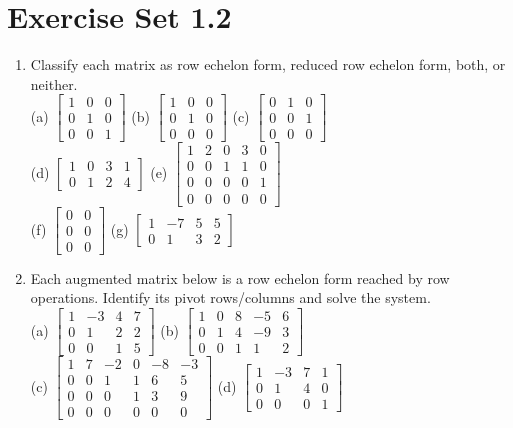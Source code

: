 \documentclass{article}
\theoremstyle{mystyle}
\begin{document}
\section*{Exercise Set 1.2}
\begin{enumerate}
    \item[1.] Classify each matrix as row echelon form, reduced row echelon form, both, or neither.\\
    (a) $\begin{bmatrix}1&0&0\\0&1&0\\0&0&1\end{bmatrix}$
    (b) $\begin{bmatrix}1&0&0\\0&1&0\\0&0&0\end{bmatrix}$
    (c) $\begin{bmatrix}0&1&0\\0&0&1\\0&0&0\end{bmatrix}$\\[2mm]
    (d) $\begin{bmatrix}1&0&3&1\\0&1&2&4\end{bmatrix}$
    (e) $\begin{bmatrix}1&2&0&3&0\\0&0&1&1&0\\0&0&0&0&1\\0&0&0&0&0\end{bmatrix}$\\[2mm]
    (f) $\begin{bmatrix}0&0\\0&0\\0&0\end{bmatrix}$
    (g) $\begin{bmatrix}1&-7&5&5\\0&1&3&2\end{bmatrix}$

    \item[3.] Each augmented matrix below is a row echelon form reached by row operations. Identify its pivot rows/columns and solve the system.\\
    (a) $\begin{bmatrix}1&-3&4&7\\0&1&2&2\\0&0&1&5\end{bmatrix}$
    (b) $\begin{bmatrix}1&0&8&-5&6\\0&1&4&-9&3\\0&0&1&1&2\end{bmatrix}$\\[2mm]
    (c) $\begin{bmatrix}1&7&-2&0&-8&-3\\0&0&1&1&6&5\\0&0&0&1&3&9\\0&0&0&0&0&0\end{bmatrix}$
    (d) $\begin{bmatrix}1&-3&7&1\\0&1&4&0\\0&0&0&1\end{bmatrix}$


\end{enumerate}
\end{document}
